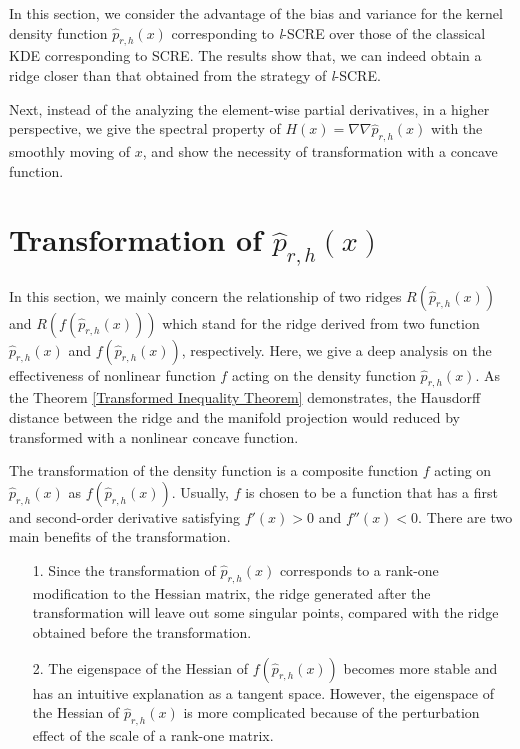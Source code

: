 \documentclass[aos,preprint]{imsart}
\theoremstyle{remark}
\begin{document}
In this section, we consider the advantage of the bias and variance for the kernel density function $\hat{p}_{r,h}(x)$ corresponding to {\it l}-SCRE over those of the classical KDE corresponding to SCRE. The results show that, we can indeed obtain a ridge closer than that obtained from the strategy of {\it l}-SCRE.

Next, instead of the analyzing the element-wise partial derivatives, in a higher perspective, we give the spectral property of $H(x) = \nabla\nabla \hat{p}_{r,h}(x)$ with the smoothly moving of $x$, and show the necessity of transformation with a concave function.
\section{Transformation of $\hat{p}_{r,h}(x)$}
In this section, we mainly concern the relationship of two ridges $R({\hat{p}_{r,h}(x)})$ and $R({f({\hat{p}_{r,h}(x)})})$ which stand for the ridge derived from two function $\hat{p}_{r,h}(x)$ and  $f( \hat{p}_{r,h}(x))$, respectively. Here, we give a deep analysis on the effectiveness of nonlinear function $f$ acting on the density function $\hat{p}_{r,h}(x)$. As the Theorem \ref{Transformed Inequality Theorem} demonstrates, the Hausdorff distance between the ridge and the manifold projection would reduced by transformed with a nonlinear concave function.

The transformation of the density function is a composite function $f$ acting on $\hat{p}_{r,h}(x)$ as $f( \hat{p}_{r,h}(x))$. Usually, $f$ is chosen to be a function that has a first and second-order derivative satisfying $f'(x)>0$ and $f''(x)<0$. There are two main benefits of the transformation.
\begin{itemize}
\item[1.] Since the transformation of $\hat{p}_{r,h}(x)$ corresponds to a rank-one modification to the Hessian matrix, the ridge generated after the transformation will leave out some singular points, compared with the ridge obtained before the transformation.
\item[2.] The eigenspace of the Hessian of $f( \hat{p}_{r,h}(x))$ becomes more stable and has an intuitive explanation as a tangent space. However, the eigenspace of the Hessian of $\hat{p}_{r,h}(x)$ is more complicated because of the perturbation effect of the scale of a rank-one matrix.
\end{itemize}
\end{document}
